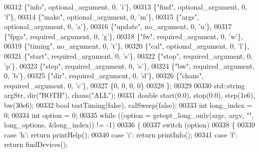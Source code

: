 \begin{DoxyCode}
{{{00312         \{\textcolor{stringliteral}{"info"}, optional\_argument, 0, \textcolor{charliteral}{'i'}\},
00313         \{\textcolor{stringliteral}{"find"}, optional\_argument, 0, \textcolor{charliteral}{'f'}\},
00314         \{\textcolor{stringliteral}{"make"}, optional\_argument, 0, \textcolor{charliteral}{'m'}\},
00315         \{\textcolor{stringliteral}{"args"}, optional\_argument, 0, \textcolor{charliteral}{'a'}\},
00316         \{\textcolor{stringliteral}{"update"},     no\_argument, 0, \textcolor{charliteral}{'u'}\},
00317         \{\textcolor{stringliteral}{"fpga"}, required\_argument, 0, \textcolor{charliteral}{'g'}\},
00318         \{\textcolor{stringliteral}{"fw"},   required\_argument, 0, \textcolor{charliteral}{'w'}\},
00319         \{\textcolor{stringliteral}{"timing"},     no\_argument, 0, \textcolor{charliteral}{'t'}\},
00320         \{\textcolor{stringliteral}{"cal"},     optional\_argument, 0, \textcolor{charliteral}{'l'}\},
00321         \{\textcolor{stringliteral}{"start"},   required\_argument, 0, \textcolor{charliteral}{'s'}\},
00322         \{\textcolor{stringliteral}{"stop"},    required\_argument, 0, \textcolor{charliteral}{'p'}\},
00323         \{\textcolor{stringliteral}{"step"},    required\_argument, 0, \textcolor{charliteral}{'e'}\},
00324         \{\textcolor{stringliteral}{"bw"},      required\_argument, 0, \textcolor{charliteral}{'b'}\},
00325         \{\textcolor{stringliteral}{"dir"},     required\_argument, 0, \textcolor{charliteral}{'d'}\},
00326         \{\textcolor{stringliteral}{"chans"},   required\_argument, 0, \textcolor{charliteral}{'c'}\},
00327         \{0, 0, 0,  0\}
00328     \};
00329 
00330     std::string argStr, dir(\textcolor{stringliteral}{"BOTH"}), chans(\textcolor{stringliteral}{"ALL"});
00331     \textcolor{keywordtype}{double} start(0.0), stop(0.0), step(1e6), bw(30e6);
00332     \textcolor{keywordtype}{bool} testTiming(\textcolor{keyword}{false}), calSweep(\textcolor{keyword}{false});
00333     \textcolor{keywordtype}{int} long\_index = 0;
00334     \textcolor{keywordtype}{int} option = 0;
00335     \textcolor{keywordflow}{while} ((option = getopt\_long\_only(argc, argv, \textcolor{stringliteral}{""}, long\_options, &long\_index)) != -1)
00336     \{
00337         \textcolor{keywordflow}{switch} (option)
00338         \{
00339         \textcolor{keywordflow}{case} \textcolor{charliteral}{'h'}: \textcolor{keywordflow}{return} printHelp();
00340         \textcolor{keywordflow}{case} \textcolor{charliteral}{'i'}: \textcolor{keywordflow}{return} printInfo();
00341         \textcolor{keywordflow}{case} \textcolor{charliteral}{'f'}: \textcolor{keywordflow}{return} findDevices();
}}}
\end{DoxyCode}
